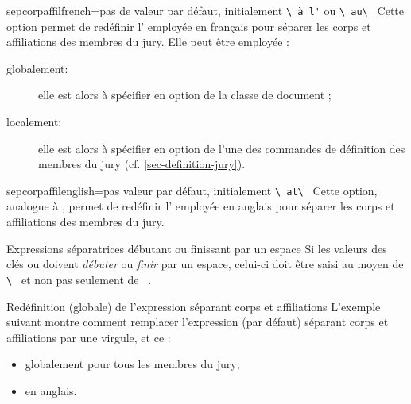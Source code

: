 \begin{docKey}{sepcorpaffilfrench}{=}{pas de valeur par défaut,
    initialement \lstinline[showspaces]+\ à l'+ ou
    \lstinline[showspaces]+\ au\ +}
  Cette option permet de redéfinir l' employée en français
  pour séparer les corps et affiliations des membres du jury. Elle peut
  être employée :
  \begin{description}
  \item[globalement:] elle est alors à spécifier en option de la classe de
    document ;
  \item[localement:] elle est alors à spécifier en option de l'une des
    commandes de définition des membres du jury (cf.
    \vref{sec-definition-jury}).
  \end{description}
\end{docKey}

\begin{docKey}{sepcorpaffilenglish}{=}{pas valeur par
    défaut, initialement \lstinline[showspaces]+\ at\ +}
  Cette option, analogue à , permet de redéfinir
  l' employée en anglais pour séparer les corps et
  affiliations des membres du jury.
\end{docKey}

\begin{dbwarning}{Expressions séparatrices débutant ou finissant par un espace}{}
  Si les valeurs des clés  ou
   doivent \emph{débuter} ou \emph{finir} par un
  espace, celui-ci doit être saisi au moyen de
  \lstinline[showspaces]+\ +
  et non pas seulement de
  \lstinline[showspaces]+ +.
\end{dbwarning}

\begin{dbexample}{Redéfinition (globale) de l'expression séparant corps et
    affiliations}{}
  L'exemple suivant montre comment remplacer l'expression (par défaut) séparant
  corps et affiliations par une virgule, et ce :
  \begin{itemize}
  \item globalement pour tous les membres du jury;
  \item en anglais.
  \end{itemize}
\end{dbexample}

